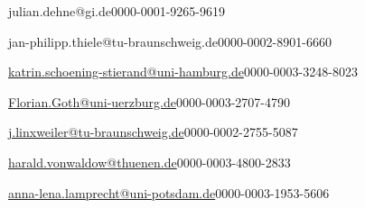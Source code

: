 


\author[1]{Julian Dehne}{julian.dehne@gi.de}{0000-0001-9265-9619}
\author[2]{Jan Philipp Thiele}{jan-philipp.thiele@tu-braunschweig.de}{0000-0002-8901-6660}
\author[3]{Katrin Schöning-Stierand}{\href{mailto:katrin.schoening-stierand@uni-hamburg.de}{katrin.schoening-stierand@uni-hamburg.de}}{0000-0003-3248-8023}
\author[4]{Florian Goth}{\href{mailto:Florian.Goth@uni-wuerzburg.de}{Florian.Goth@uni-uerzburg.de}}{0000-0003-2707-4790}
\author[2]{Jan Linxweiler}{\href{mailto:j.linxweiler@tu-braunschweig.de}{j.linxweiler@tu-braunschweig.de}}{0000-0002-2755-5087}
\author[6]{Harald von Waldow}{\href{mailto:harald.vonwaldow@thuenen.de}{harald.vonwaldow@thuenen.de}}{0000-0003-4800-2833}
\author[7]{Anna-Lena Lamprecht}{\href{mailto:anna-lena.lamprecht@uni-potsdam.de}{anna-lena.lamprecht@uni-potsdam.de}}{0000-0003-1953-5606}

